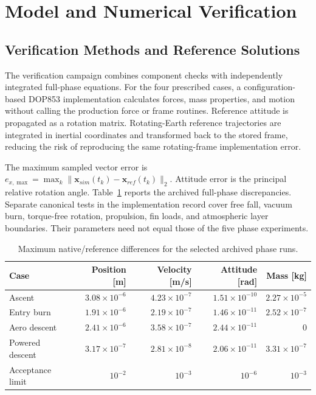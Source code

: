\documentclass[11pt,letterpaper]{article}
\begin{document}
\section{Model and Numerical Verification}\label{sec:verification}
\subsection{Verification Methods and Reference Solutions}
The verification campaign combines component checks with independently integrated full-phase equations. For the four prescribed cases, a configuration-based DOP853 implementation calculates forces, mass properties, and motion without calling the production force or frame routines. Reference attitude is propagated as a rotation matrix. Rotating-Earth reference trajectories are integrated in inertial coordinates and transformed back to the stored frame, reducing the risk of reproducing the same rotating-frame implementation error.

The maximum sampled vector error is $e_{x,\max}=\max_k\|\bm x_{sim}(t_k)-\bm x_{ref}(t_k)\|_2$. Attitude error is the principal relative rotation angle. Table~\ref{tab:verification} reports the archived full-phase discrepancies. Separate canonical tests in the implementation record cover free fall, vacuum burn, torque-free rotation, propulsion, fin loads, and atmospheric layer boundaries. Their parameters need not equal those of the five phase experiments.
\begin{table}[!htbp]
\centering\small
\caption{Maximum native/reference differences for the selected archived phase runs.}\label{tab:verification}
\begin{tabular}{lrrrr}\toprule
Case & Position [m] & Velocity [m/s] & Attitude [rad] & Mass [kg]\\\midrule
Ascent & $3.08\times10^{-6}$ & $4.23\times10^{-7}$ & $1.51\times10^{-10}$ & $2.27\times10^{-5}$\\
Entry burn & $1.91\times10^{-6}$ & $2.19\times10^{-7}$ & $1.46\times10^{-11}$ & $2.52\times10^{-7}$\\
Aero descent & $2.41\times10^{-6}$ & $3.58\times10^{-7}$ & $2.44\times10^{-11}$ & 0\\
Powered descent & $3.17\times10^{-7}$ & $2.81\times10^{-8}$ & $2.06\times10^{-11}$ & $3.31\times10^{-7}$\\\midrule
Acceptance limit & $10^{-2}$ & $10^{-3}$ & $10^{-6}$ & $10^{-3}$\\\bottomrule
\end{tabular}
\end{table}
\end{document}
